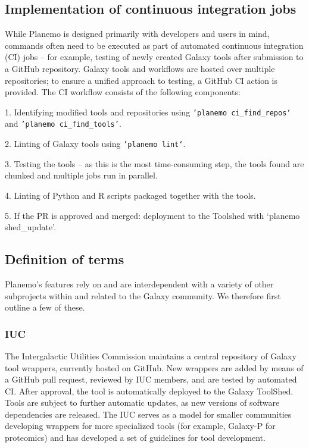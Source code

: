 \subsection*{Implementation of continuous integration jobs}

While Planemo is designed primarily with developers and users in mind,
commands often need to be executed as part of automated continuous
integration (CI) jobs -- for example, testing of newly created Galaxy
tools after submission to a GitHub repository. Galaxy tools and
workflows are hosted over multiple repositories; to ensure a unified
approach to testing, a GitHub CI action is provided. The CI workflow
consists of the following components:

1. Identifying modified tools and repositories using
\texttt{'planemo\ ci\_find\_repos`} and
\texttt{'planemo\ ci\_find\_tools'}.

2. Linting of Galaxy tools using \texttt{'planemo\ lint`}.

3. Testing the tools -- as this is the most time-consuming step, the
tools found are chunked and multiple jobs run in parallel.

4. Linting of Python and R scripts packaged together with the tools.

5. If the PR is approved and merged: deployment to the Toolshed with
`planemo shed\_update'.

\subsection*{Definition of terms}

Planemo's features rely on and are interdependent with a variety of
other subprojects within and related to the Galaxy community. We
therefore first outline a few of these.

\subsubsection*{IUC}

The Intergalactic Utilities Commission \cite{Intergalactic_Utilities_Commission_2022} maintains a central
repository of Galaxy tool wrappers, currently hosted on GitHub. New
wrappers are added by means of a GitHub pull request, reviewed by IUC
members, and are tested by automated CI. After approval, the tool is
automatically deployed to the Galaxy ToolShed. Tools are subject to
further automatic updates, as new versions of software dependencies are
released. The IUC serves as a model for smaller communities developing
wrappers for more specialized tools (for example, Galaxy-P \cite{blank2018disseminating} for
proteomics) and has developed a set of guidelines for tool development.

